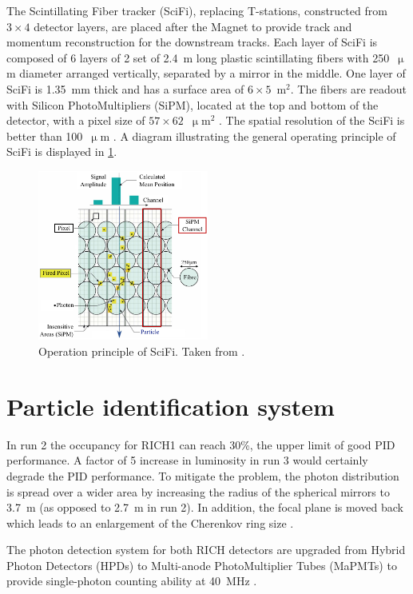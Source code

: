 The Scintillating Fiber tracker (SciFi), replacing T-stations,
constructed from $3 \times 4$ detector layers,
are placed after the Magnet to provide track and momentum
reconstruction for the downstream tracks.
Each layer of SciFi is composed of 6 layers of 2 set of
2.4~m long plastic scintillating fibers with 250~$\upmu$m diameter arranged
vertically, separated by a mirror in the middle.
One layer of SciFi is 1.35~mm thick and has a surface area of $6 \times
5$~m$^2$.
The fibers are readout with Silicon PhotoMultipliers (SiPM), located at the top
and bottom of the detector,
with a pixel size of $57 \times 62$~$\upmu$m$^2$
\cite{Piucci_2017,Massafferri_2020}.
The spatial resolution of the SciFi is better than 100~$\upmu$m
\cite{Massafferri_2020}.
A diagram illustrating the general operating principle of SciFi is displayed
in \cref{fig:scifi-op}.

\begin{figure}[!htb]
    \centering
    \includegraphics[width=0.5\textwidth]{./figs-lhcb-upgrade-overview/tracking/scifi_op_principle.pdf}
    \caption{
        Operation principle of SciFi.
        Taken from \cite{Berninghoff:2810671}.
    }
    \label{fig:scifi-op}
\end{figure}


\section{Particle identification system}
\label{ref:lhcb-upgrade-overview:pid}

In run 2 the occupancy for RICH1 can reach 30\%,
the upper limit of good PID performance.
A factor of 5 increase in luminosity in run 3 would certainly degrade the PID
performance.
To mitigate the problem,
the photon distribution is spread over a wider area by increasing the
radius of the spherical mirrors to 3.7~m (as opposed to 2.7~m in run 2).
In addition, the focal plane is moved back which leads to an enlargement
of the Cherenkov ring size
\cite{D_Ambrosio_2017,Okamura:2837863}.

The photon detection system for both RICH detectors are upgraded from
Hybrid Photon Detectors (HPDs) to Multi-anode PhotoMultiplier Tubes (MaPMTs)
to provide single-photon counting ability at 40~MHz
\cite{Okamura:2837863}.
